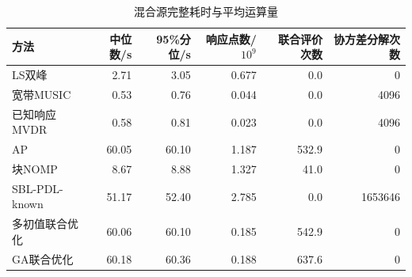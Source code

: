 \begin{table}[htbp]\centering\small
\caption{混合源完整耗时与平均运算量}\label{tab:g10-cost}
\begin{tabular}{lrrrrr}\toprule
方法 & 中位数/s & 95\%分位/s & 响应点数/$10^9$ & 联合评价次数 & 协方差分解次数\\\midrule
LS双峰 & 2.71 & 3.05 & 0.677 & 0.0 & 0\\
宽带MUSIC & 0.53 & 0.76 & 0.044 & 0.0 & 4096\\
已知响应MVDR & 0.58 & 0.81 & 0.023 & 0.0 & 4096\\
AP & 60.05 & 60.10 & 1.187 & 532.9 & 0\\
块NOMP & 8.67 & 8.88 & 1.327 & 41.0 & 0\\
SBL-PDL-known & 51.17 & 52.40 & 2.785 & 0.0 & 1653646\\
多初值联合优化 & 60.06 & 60.10 & 0.185 & 542.9 & 0\\
GA联合优化 & 60.18 & 60.36 & 0.188 & 637.6 & 0\\
\bottomrule\end{tabular}
\end{table}